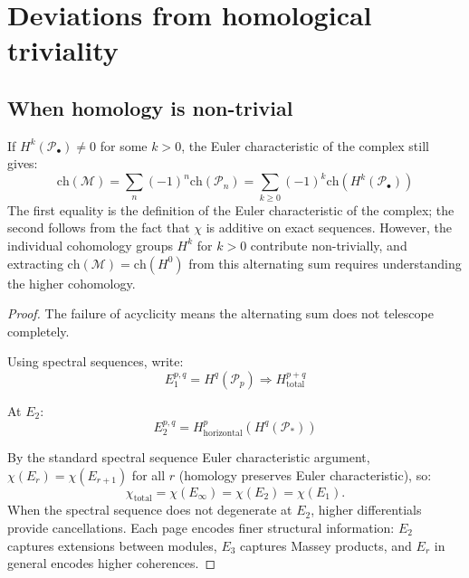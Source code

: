 \section{Deviations from homological triviality}\label{sec:deviations-triviality}

\subsection{When homology is non-trivial}

\begin{theorem}\label{thm:character-homological-corrections}
If $H^k(\mathcal{P}_\bullet) \neq 0$ for some $k > 0$, the Euler characteristic of the complex still gives:
\[
\text{ch}(\mathcal{M}) = \sum_{n} (-1)^n \text{ch}(\mathcal{P}_n) = \sum_{k \geq 0} (-1)^k \text{ch}(H^k(\mathcal{P}_\bullet))
\]
The first equality is the definition of the Euler characteristic of the complex; the second follows from the fact that $\chi$ is additive on exact sequences.  However, the individual cohomology groups $H^k$ for $k > 0$ contribute non-trivially, and extracting $\text{ch}(\mathcal{M}) = \text{ch}(H^0)$ from this alternating sum requires understanding the higher cohomology.
\end{theorem}

\begin{proof}
The failure of acyclicity means the alternating sum does not telescope completely.

Using spectral sequences, write:
\[
E_1^{p,q} = H^q(\mathcal{P}_p) \Rightarrow H^{p+q}_{\text{total}}
\]

At $E_2$:
\[
E_2^{p,q} = H^p_{\text{horizontal}}(H^q(\mathcal{P}_*))
\]

By the standard spectral sequence Euler characteristic argument, $\chi(E_r) = \chi(E_{r+1})$ for all $r$ (homology preserves Euler characteristic), so:
\[
\chi_{\text{total}} = \chi(E_\infty) = \chi(E_2) = \chi(E_1).
\]
When the spectral sequence does not degenerate at $E_2$, higher differentials provide cancellations.
Each page encodes finer structural information: $E_2$ captures extensions between modules, $E_3$ captures Massey products, and $E_r$ in general encodes higher coherences.
\end{proof}


